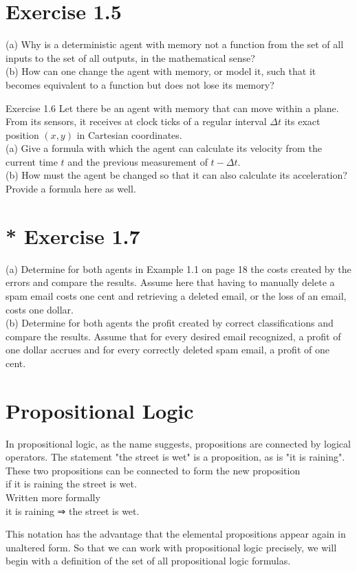 \documentclass[10pt]{article}
\begin{document}
\section*{Exercise 1.5}
(a) Why is a deterministic agent with memory not a function from the set of all inputs to the set of all outputs, in the mathematical sense?\\
(b) How can one change the agent with memory, or model it, such that it becomes equivalent to a function but does not lose its memory?

Exercise 1.6 Let there be an agent with memory that can move within a plane. From its sensors, it receives at clock ticks of a regular interval $\Delta t$ its exact position $(x, y)$ in Cartesian coordinates.\\
(a) Give a formula with which the agent can calculate its velocity from the current time $t$ and the previous measurement of $t-\Delta t$.\\
(b) How must the agent be changed so that it can also calculate its acceleration? Provide a formula here as well.

\section*{* Exercise 1.7}
(a) Determine for both agents in Example 1.1 on page 18 the costs created by the errors and compare the results. Assume here that having to manually delete a spam email costs one cent and retrieving a deleted email, or the loss of an email, costs one dollar.\\
(b) Determine for both agents the profit created by correct classifications and compare the results. Assume that for every desired email recognized, a profit of one dollar accrues and for every correctly deleted spam email, a profit of one cent.

\section*{Propositional Logic}
In propositional logic, as the name suggests, propositions are connected by logical operators. The statement "the street is wet" is a proposition, as is "it is raining". These two propositions can be connected to form the new proposition\\
if it is raining the street is wet.\\
Written more formally\\
it is raining ⇒ the street is wet.

This notation has the advantage that the elemental propositions appear again in unaltered form. So that we can work with propositional logic precisely, we will begin with a definition of the set of all propositional logic formulas.
\end{document}
